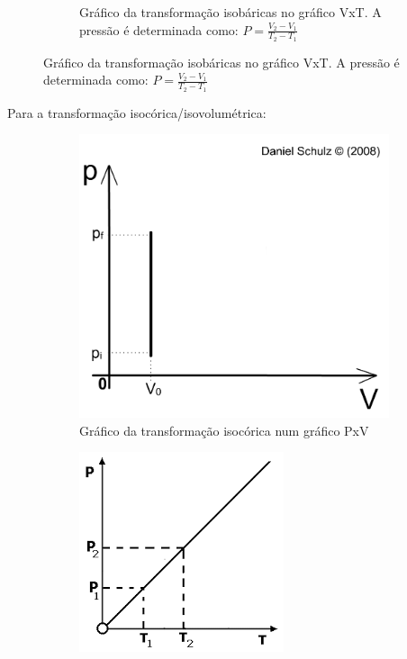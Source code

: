 \documentclass[12pt]{extarticle}
\newcommand{\<}{\langle}
\renewcommand{\>}{\rangle}
\theoremstyle{definition}
\begin{document}
\begin{figure}[h]
\begin{subfigure}[b]{0.45\textwidth}
         \caption{Gráfico da transformação isobáricas no gráfico VxT. A pressão é determinada como: $P = \frac{V_2-V_1}{T_2-T_1}$}
         \label{fig:isobarica_vt}
     \end{subfigure}
\end{figure}

Para a transformação isocórica/isovolumétrica:
\begin{figure}[H]
     \centering
     \begin{subfigure}[b]{0.45\textwidth}
         \centering
         \includegraphics[width=\textwidth]{isocorica.jpg}
         \caption{Gráfico da transformação isocórica num gráfico PxV}
         \label{fig:isocorica_pv}
     \end{subfigure}
     \hfill
     \begin{subfigure}[b]{0.45\textwidth}
         \centering
         \includegraphics[width=\textwidth]{isovolumetria.png}

\end{subfigure}
\end{figure}
\end{document}
